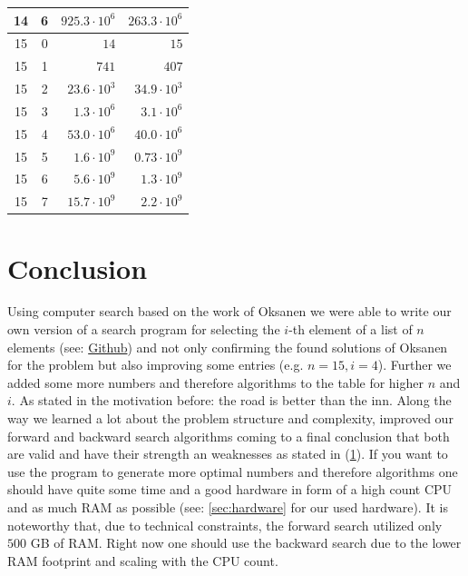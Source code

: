 \documentclass[10pt,journal,compsoc]{IEEEtran}
\begin{document}
\begin{table}[!t]
\begin{tabular}{c|c|r|r}
    14         & 6          & $925.3 \cdot 10^6$      & $263.3 \cdot 10^6$       \\
    \hline
    15         & 0          & $14$                    & $15$                     \\
    15         & 1          & $741$                   & $407$                    \\
    15         & 2          & $23.6 \cdot 10^3$       & $34.9 \cdot 10^3$        \\
    15         & 3          & $1.3 \cdot 10^6$        & $3.1 \cdot 10^6$         \\
    15         & 4          & $53.0 \cdot 10^6$       & $40.0 \cdot 10^6$        \\
    15         & 5          & $1.6 \cdot 10^9$        & $0.73 \cdot 10^9$        \\
    15         & 6          & $5.6 \cdot 10^9$        & $1.3 \cdot 10^9$         \\
    15         & 7          & $15.7 \cdot 10^9$       & $2.2 \cdot 10^9$         \\
  \end{tabular}
\end{table}


\section{Conclusion}

Using computer search based on the work of Oksanen we were able to write our own version of a search program for selecting the $i$-th element of a list of $n$ elements (see: \href{https://github.com/JGDoerrer/selection_generator}{Github}) and not only confirming the found solutions of Oksanen for the problem but also improving some entries (e.g. $n = 15, i = 4$).
Further we added some more numbers and therefore algorithms to the table for higher $n$ and $i$.
As stated in the motivation before: the road is better than the inn.
Along the way we learned a lot about the problem structure and complexity, improved our forward and backward search algorithms coming to a final conclusion that both are valid and have their strength an weaknesses as stated in (\ref{}). %
If you want to use the program to generate more optimal numbers and therefore algorithms one should have quite some time and a good hardware in form of a high count CPU and as much RAM as possible (see: \ref{sec:hardware} for our used hardware).
It is noteworthy that, due to technical constraints, the forward search utilized only $500$ GB of RAM. %
Right now one should use the backward search due to the lower RAM footprint and scaling with the CPU count.
\end{document}
